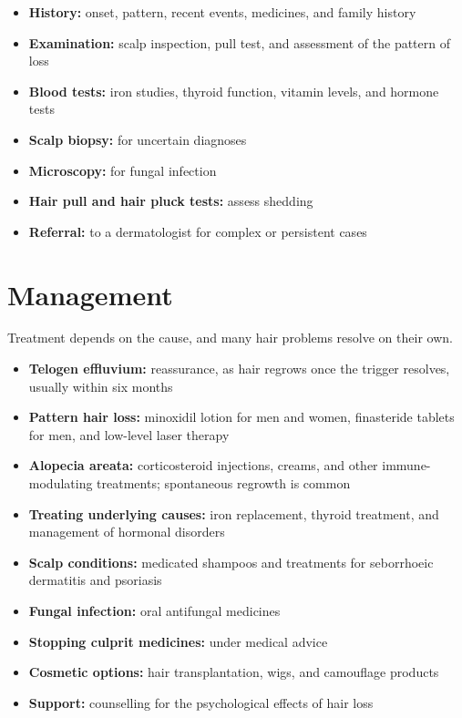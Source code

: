 \begin{itemize}
    \item \textbf{History:} onset, pattern, recent events, medicines, and family history
    \item \textbf{Examination:} scalp inspection, pull test, and assessment of the pattern of loss
    \item \textbf{Blood tests:} iron studies, thyroid function, vitamin levels, and hormone tests
    \item \textbf{Scalp biopsy:} for uncertain diagnoses
    \item \textbf{Microscopy:} for fungal infection
    \item \textbf{Hair pull and hair pluck tests:} assess shedding
    \item \textbf{Referral:} to a dermatologist for complex or persistent cases
\end{itemize}

\section*{Management}
Treatment depends on the cause, and many hair problems resolve on their own.

\begin{itemize}
    \item \textbf{Telogen effluvium:} reassurance, as hair regrows once the trigger resolves, usually within six months
    \item \textbf{Pattern hair loss:} minoxidil lotion for men and women, finasteride tablets for men, and low-level laser therapy
    \item \textbf{Alopecia areata:} corticosteroid injections, creams, and other immune-modulating treatments; spontaneous regrowth is common
    \item \textbf{Treating underlying causes:} iron replacement, thyroid treatment, and management of hormonal disorders
    \item \textbf{Scalp conditions:} medicated shampoos and treatments for seborrhoeic dermatitis and psoriasis
    \item \textbf{Fungal infection:} oral antifungal medicines
    \item \textbf{Stopping culprit medicines:} under medical advice
    \item \textbf{Cosmetic options:} hair transplantation, wigs, and camouflage products
    \item \textbf{Support:} counselling for the psychological effects of hair loss
\end{itemize}

